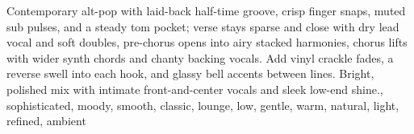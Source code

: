 
\begin{notes}
\end{notes}
\begin{style}
Contemporary alt-pop with laid-back half-time groove, crisp finger snaps, muted sub pulses, and a steady tom pocket; verse stays sparse and close with dry lead vocal and soft doubles, pre-chorus opens into airy stacked harmonies, chorus lifts with wider synth chords and chanty backing vocals. %
Add vinyl crackle fades, a reverse swell into each hook, and glassy bell accents between lines. %
Bright, polished mix with intimate front-and-center vocals and sleek low-end shine., sophisticated, moody, smooth, classic, lounge, low, gentle, warm, natural, light, refined, ambient
\end{style}
